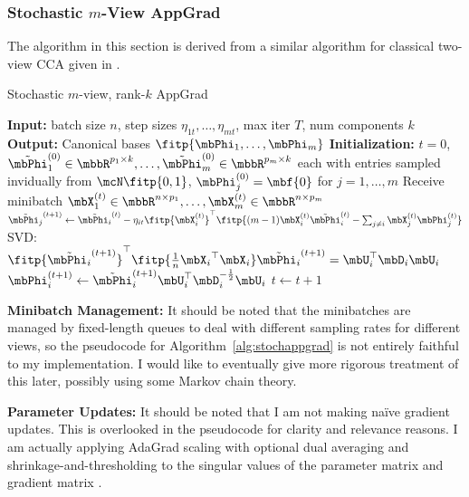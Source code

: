 \documentclass{article}
\begin{document}
	\subsubsection{Stochastic $m$-View AppGrad} \label{subsubsec:appgrad}
	
	The algorithm in this section is derived from a similar algorithm for classical two-view CCA given in \cite{ma2015finding}.
	
	\begin{algorithm}
	\caption{Stochastic $m$-view, rank-$k$ AppGrad} \label{alg:stochappgrad}
	\begin{algorithmic}[1]
		\STATE \textbf{Input:} batch size $n$, step sizes $\eta_{1t},\ldots,\eta_{mt}$, max iter $T$, num components $k$
		\STATE \textbf{Output:} Canonical bases $\fitp{\mbPhi_1, \ldots, \mbPhi_m}$
		\STATE \textbf{Initialization:} $t=0$, $\tilde{\mbPhi}_1^{(0)} \in \mbbR^{p_1 \times k}, \ldots, \tilde{\mbPhi}_m^{(0)} \in \mbbR^{p_m \times k}$ each with entries sampled invidually from $\mcN \fitp{0,1}$, $\mbPhi_j^{(0)} = \mbf{0}$ for $j = 1,\ldots,m$
		\STATE Receive minibatch $\mbX_1^{(t)} \in \mbbR^{n \times p_1}, \ldots, \mbX_m^{(t)} \in \mbbR^{n \times p_m}$
		\STATE $\tilde{\mbPhi_j}^{(t+1)} \leftarrow \tilde{\mbPhi_i}^{(t)} - \eta_{it}\fitp{\mbX_i^{(t)}}^{\top}\fitp{(m-1)\mbX_i^{(t)}\tilde{\mbPhi}_i^{(t)} - \sum_{j \neq i}\mbX_j^{(t)}\mbPhi_j^{(t)}}$
		\STATE SVD: $\fitp{\tilde{\mbPhi_i}^{(t+1)}}^{\top} \fitp{\frac{1}{n} {\mbX_i}^{\top}\mbX_i}\tilde{\mbPhi_i}^{(t+1)} = \mbU_i^{\top}\mbD_i\mbU_i$
		\STATE $\mbPhi_i^{(t+1)} \leftarrow \tilde{\mbPhi}_i^{(t+1)}\mbU_i^{\top}\mbD_i^{-\frac{1}{2}}\mbU_i$
		\ENDFOR
		\STATE $t \leftarrow t+1$
		\ENDWHILE
	\end{algorithmic}
	\end{algorithm}
	
	\noindent \textbf{Minibatch Management:} It should be noted that the minibatches are managed by fixed-length queues to deal with different sampling rates for different views, so the pseudocode for Algorithm~\ref{alg:stochappgrad} is not entirely faithful to my implementation. I would like to eventually give more rigorous treatment of this later, possibly using some Markov chain theory.
	
	\noindent \textbf{Parameter Updates:} It should be noted that I am not making na\"{i}ve gradient updates. This is overlooked in the pseudocode for clarity and relevance reasons. I am actually applying AdaGrad scaling with optional dual averaging and shrinkage-and-thresholding to the singular values of the parameter matrix and gradient matrix \citep{duchi2011adaptive}.
	
\end{document}
